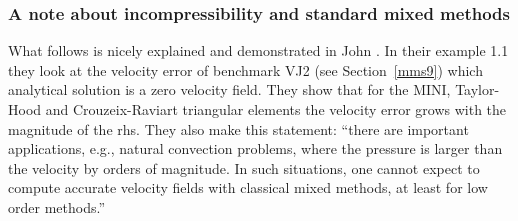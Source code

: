 \subsubsection{A note about incompressibility and standard mixed methods}

What follows is nicely explained and demonstrated in John \etal \cite{jolm17}. In their 
example 1.1 they look at the velocity error of benchmark VJ2 (see Section~\ref{mms9}) 
which analytical solution is a zero velocity field. They show that for the MINI, 
Taylor-Hood and Crouzeix-Raviart triangular elements the velocity error grows 
with the magnitude of the rhs. They also make this statement:
``there are important applications, e.g., natural
convection problems, where the pressure is larger than the velocity by orders
of magnitude. In such situations, one cannot expect to compute accurate
velocity fields with classical mixed methods, at least for low order methods.''


